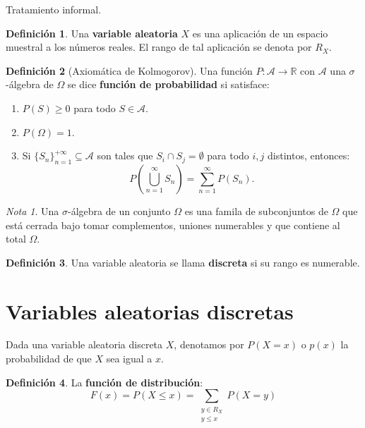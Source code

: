 \documentclass{article}
\author{NyKi}
\date{Diciembre 2024}
\theoremstyle{definition}
\newtheorem{define}{Definición}
\theoremstyle{remark}
\newtheorem{note}{Nota}
\newcommand{\reales}{\mathbb{R}}
\begin{document}
Tratamiento informal.

\begin{define}
	Una \textbf{variable aleatoria} $X$ es una aplicación de un espacio muestral a los números reales. El rango de tal aplicación se denota por $R_X$.
\end{define}
\begin{define}[Axiomática de Kolmogorov]
	Una función $P: \mathcal{A} \rightarrow \reales$ con $\mathcal{A}$ una $\sigma$-álgebra de $\Omega$ se dice \textbf{función de probabilidad} si satisface:
	\begin{enumerate}
		\item
		$P(S) \geq 0$ para todo $S \in \mathcal{A}$.
		\item
		$P(\Omega) = 1$.
		\item
		Si $\{S_n \}_{n=1}^{+\infty} \subseteq \mathcal{A}$ son tales que $S_i \cap S_j = \emptyset$ para todo $i,j$ distintos, entonces:
		\begin{equation*}
			P(\bigcup_{n=1}^{\infty} S_n) = \sum_{n=1}^{\infty} P(S_n).
		\end{equation*}			 
	\end{enumerate}
\end{define}

\begin{note}
	Una $\sigma$-álgebra de un conjunto $\Omega$ es una famila de subconjuntos de $\Omega$ que está cerrada bajo tomar complementos, uniones numerables y que contiene al total $\Omega$.
\end{note}

\begin{define}
	Una variable aleatoria se llama \textbf{discreta} si su rango es numerable.
\end{define}
	
\section{Variables aleatorias discretas}
Dada una variable aleatoria discreta $X$, denotamos por $P(X = x)$ o $p(x)$ la probabilidad de que $X$ sea igual a $x$.

\begin{define}
	La \textbf{función de distribución}:
	\begin{equation*}
		F(x) = P(X \leq x) = \sum_{\substack{y \in R_X \\ y \leq x}} P(X = y)
	\end{equation*}
\end{define}
\end{document}
